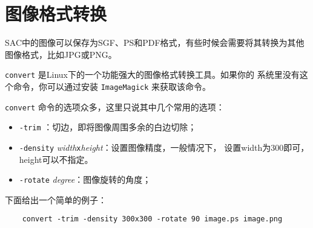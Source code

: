 \section{图像格式转换}
\label{sec:format-conversion}

SAC中的图像可以保存为SGF、PS和PDF格式，有些时候会需要将其转换为其他
图像格式，比如JPG或PNG。

\texttt{convert} 是Linux下的一个功能强大的图像格式转换工具。如果你的
系统里没有这个命令，你可以通过安装 \texttt{ImageMagick} 来获取该命令。

\texttt{convert} 命令的选项众多，这里只说其中几个常用的选项：
\begin{itemize}
\item \texttt{-trim} ：切边，即将图像周围多余的白边切除；
\item \texttt{-density}  \textit{width}\texttt{x}\textit{height}：设置图像精度，一般情况下，
    设置width为300即可，height可以不指定。
\item \texttt{-rotate}  \textit{degree}：图像旋转的角度；
\end{itemize}

下面给出一个简单的例子：
\begin{verbatim}
    convert -trim -density 300x300 -rotate 90 image.ps image.png
\end{verbatim}
